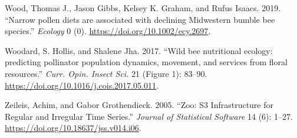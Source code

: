 \documentclass[11pt,]{article}
\begin{document}
\leavevmode\hypertarget{ref-Wood2019}{}%
Wood, Thomas J., Jason Gibbs, Kelsey K. Graham, and Rufus Isaacs. 2019.
``Narrow pollen diets are associated with declining Midwestern bumble
bee species.'' \emph{Ecology} 0 (0).
\url{https://doi.org/10.1002/ecy.2697}.

\leavevmode\hypertarget{ref-Woodard2017}{}%
Woodard, S. Hollis, and Shalene Jha. 2017. ``Wild bee nutritional
ecology: predicting pollinator population dynamics, movement, and
services from floral resources.'' \emph{Curr. Opin. Insect Sci.} 21
(Figure 1): 83--90. \url{https://doi.org/10.1016/j.cois.2017.05.011}.

\leavevmode\hypertarget{ref-zoo}{}%
Zeileis, Achim, and Gabor Grothendieck. 2005. ``Zoo: S3 Infrastructure
for Regular and Irregular Time Series.'' \emph{Journal of Statistical
Software} 14 (6): 1--27. \url{https://doi.org/10.18637/jss.v014.i06}.
\end{document}
